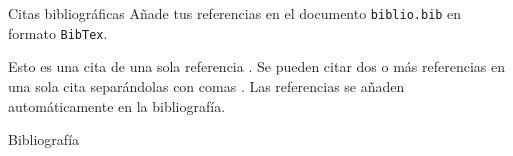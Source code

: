 \documentclass[aspectratio=169]{beamer} %
\begin{document}
\begin{frame}{Citas bibliográficas}
    Añade tus referencias en el documento \texttt{biblio.bib} en formato \texttt{BibTex}.

    Esto es una cita de una sola referencia \cite{zhang2017digital}.
    Se pueden citar dos o más referencias en una sola cita separándolas con comas \cite{praks2018advanced,santos2018online}.
    Las referencias se añaden automáticamente en la bibliografía.
\end{frame}

\begin{frame}[allowframebreaks]{Bibliografía}


\end{frame}



\begin{frame}
    \maketitle
\end{frame}
\end{document}
